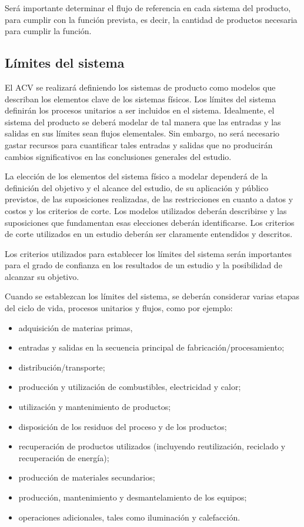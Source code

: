 Será importante determinar el flujo de referencia en cada sistema del producto, para cumplir con la función prevista, es decir, la cantidad de productos necesaria para cumplir la función.

\subsection{Límites del sistema}

El ACV se realizará definiendo los sistemas de producto como modelos que describan los elementos clave de los sistemas físicos. Los límites del sistema definirán los procesos unitarios a ser incluidos en el sistema. Idealmente, el sistema del producto se deberá modelar de tal manera que las entradas y las salidas en sus límites sean flujos elementales. Sin embargo, no será necesario gastar recursos para cuantificar tales entradas y salidas que no producirán cambios significativos en las conclusiones generales del estudio.

La elección de los elementos del sistema físico a modelar dependerá de la definición del objetivo y el alcance del estudio, de su aplicación y público previstos, de las suposiciones realizadas, de las restricciones en cuanto a datos y costos y los criterios de corte. Los modelos utilizados deberán describirse y las suposiciones que fundamentan esas elecciones deberán identificarse. Los criterios de corte utilizados en un estudio deberán ser claramente entendidos y descritos.

Los criterios utilizados para establecer los límites del sistema serán importantes para el grado de confianza en los resultados de un estudio y la posibilidad de alcanzar su objetivo.

Cuando se establezcan los límites del sistema, se deberán considerar varias etapas del ciclo de vida, procesos unitarios y flujos, como por ejemplo:
\begin{itemize}
  \item adquisición de materias primas,
  \item entradas y salidas en la secuencia principal de fabricación/procesamiento;
  \item distribución/transporte;
  \item producción y utilización de combustibles, electricidad y calor;
  \item utilización y mantenimiento de productos;
  \item disposición de los residuos del proceso y de los productos;
  \item recuperación de productos utilizados (incluyendo reutilización, reciclado y recuperación de energía);
  \item producción de materiales secundarios;
  \item producción, mantenimiento y desmantelamiento de los equipos;
  \item operaciones adicionales, tales como iluminación y calefacción.
\end{itemize}

